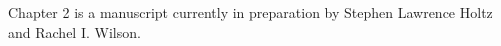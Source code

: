 \noindent Chapter 2 is a manuscript currently in preparation by Stephen Lawrence Holtz and Rachel I. Wilson.